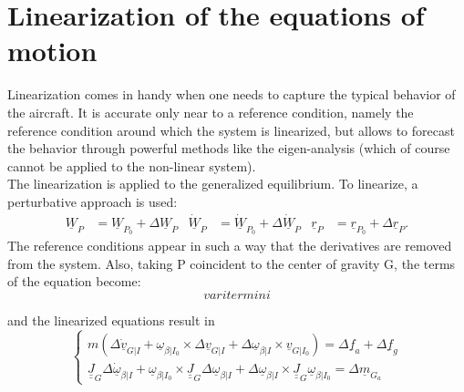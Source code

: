 \section{Linearization of the equations of motion}
Linearization comes in handy when one needs to capture the typical behavior of the aircraft. It is accurate only near to a reference condition, namely the reference condition around which the system is linearized, but allows to forecast the behavior through powerful methods like the eigen-analysis (which of course cannot be applied to the non-linear system).
\\
The linearization is applied to the generalized equilibrium. To linearize, a perturbative approach is used:
\begin{align}
    \underline{W}_P &= \underline{W}_{P_0} + \Delta \underline{W}_P & \underline{\dot W}_P &= \underline{\dot W}_{P_0} + \Delta \underline{\dot W}_P & \underline{r}_P &= \underline{r}_{P_0} + \Delta \underline{r}_P .
\end{align}
The reference conditions appear in such a way that the derivatives are removed from the system. Also, taking P coincident to the center of gravity G, the terms of the equation become:
\begin{equation}
    vari termini
\end{equation}

and the linearized equations result in
\begin{equation}
\begin{cases}
m(\Delta\underline{\dot v}_{G|I}+\underline{\omega}_{\beta|I_0}\times \Delta\underline{v}_{G|I}+\Delta\underline{\omega}_{\beta|I}\times\underline{v}_{G|I_0})=\Delta\underline{f}_a+\Delta\underline{f}_g\\
\underline{\underline{J}}_G\Delta\underline{\dot\omega}_{\beta|I}+\underline{\omega}_{\beta|I_0}\times \underline{\underline{J}}_G\Delta\underline{\omega}_{\beta|I}+\Delta\underline{\omega}_{\beta|I}\times\underline{\underline{J}}_G\underline{\omega}_{\beta|I_0} = \Delta \underline{m}_{G_a}
    \end{cases}
\end{equation}
